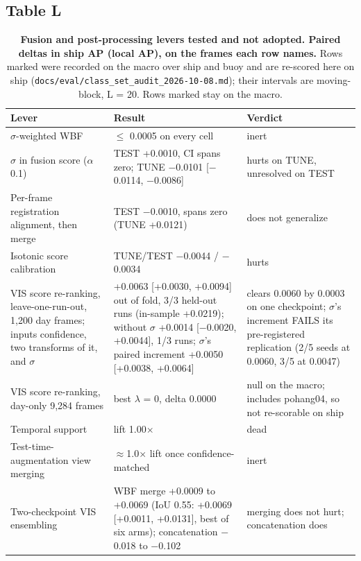 \documentclass[10pt]{article}
\begin{document}
\subsection{Table L}\label{app:J.1}
\begin{table}[htbp]
\centering
\footnotesize
\caption{\textbf{Fusion and post-processing levers tested and not adopted. Paired deltas in ship AP (local AP), on the frames each row names.} Rows marked \textdagger{} were recorded on the macro over ship and buoy and are re-scored here on ship (\texttt{docs/\allowbreak{}eval/\allowbreak{}class\_\allowbreak{}set\_\allowbreak{}audit\_\allowbreak{}2026-10-08.md}); their intervals are moving-block, L = 20. Rows marked \textdaggerdbl{} stay on the macro.}
\label{tab:L}
\begin{tabularx}{\linewidth}{>{\raggedright\arraybackslash}X>{\raggedright\arraybackslash}X>{\raggedright\arraybackslash}X}
\toprule
Lever & Result & Verdict \\
\midrule
$\sigma$-weighted WBF \textdagger{} & $\leq$ 0.0005 on every cell & inert \\
$\sigma$ in fusion score ($\alpha$ 0.1) & TEST +0.0010, CI spans zero; TUNE $-$0.0101 [$-$0.0114, $-$0.0086] & hurts on TUNE, unresolved on TEST \\
Per-frame registration alignment, then merge & TEST $-$0.0010, spans zero (TUNE +0.0121) & does not generalize \\
Isotonic score calibration & TUNE/TEST $-$0.0044 / $-$0.0034 & hurts \\
VIS score re-ranking, leave-one-run-out, 1,200 day frames; inputs confidence, two transforms of it, and $\sigma$ \textdagger{} & +0.0063 [+0.0030, +0.0094] out of fold, 3/3 held-out runs (in-sample +0.0219); without $\sigma$ +0.0014 [$-$0.0020, +0.0044], 1/3 runs; $\sigma$'s paired increment +0.0050 [+0.0038, +0.0064] & clears 0.0060 by 0.0003 on one checkpoint; $\sigma$'s increment FAILS its pre-registered replication (2/5 seeds at 0.0060, 3/5 at 0.0047) \\
VIS score re-ranking, day-only 9,284 frames \textdaggerdbl{} & best $\lambda$ = 0, delta 0.0000 & null on the macro; includes pohang04, so not re-scorable on ship \\
Temporal support \textdagger{} & lift 1.00$\times$ & dead \\
Test-time-augmentation view merging \textdagger{} & $\approx$1.0$\times$ lift once confidence-matched & inert \\
Two-checkpoint VIS ensembling \textdagger{} & WBF merge +0.0009 to +0.0069 (IoU 0.55: +0.0069 [+0.0011, +0.0131], best of six arms); concatenation $-$0.018 to $-$0.102 & merging does not hurt; concatenation does \\

\end{tabularx}
\end{table}
\end{document}
